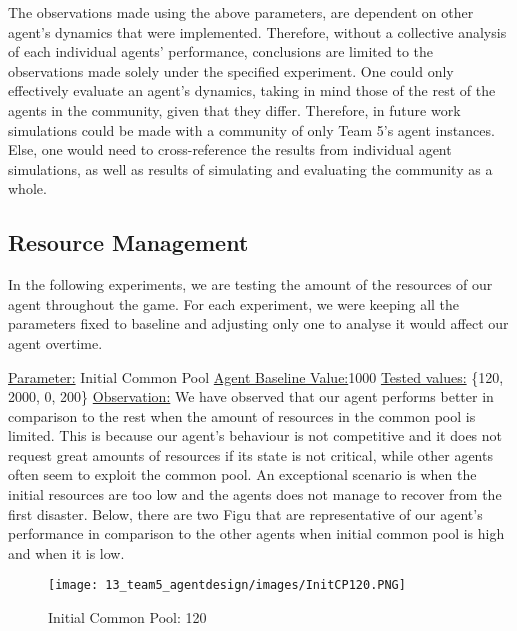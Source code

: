 The observations made using the above parameters, are dependent on other agent’s dynamics that were implemented. Therefore, without a collective analysis of each individual agents’ performance, conclusions are limited to the observations made solely under the specified experiment. One could only effectively evaluate an agent’s dynamics, taking in mind those of the rest of the agents in the community, given that they differ. Therefore, in future work simulations could be made with a community of only Team 5’s agent instances. Else, one would need to cross-reference the results from individual agent simulations, as well as results of simulating and evaluating the community as a whole. 

\subsection{Resource Management}

In the following experiments, we are testing the amount of the resources of our agent throughout the game. For each experiment, we were keeping all the parameters fixed to baseline and adjusting only one to analyse it would affect our agent overtime. 

\underline{Parameter:} Initial Common Pool \newline
\underline{Agent Baseline Value:}1000 \newline
\underline{Tested values:} \{120, 2000, 0, 200\} \newline
\underline{Observation:} \newline
We have observed that our agent performs better in comparison to the rest when the amount of resources in the common pool is limited. This is because our agent's behaviour is not competitive and it does not request great amounts of resources if its state is not critical, while other agents often seem to exploit the common pool. An exceptional scenario is when the initial resources are too low and the agents does not manage to recover from the first disaster.
Below, there are two Figu that are representative of our agent's performance in comparison to the other agents when initial common pool is high and when it is low.

\begin{figure}[!htb]
    \centering
    \texttt{[image: 13\_team5\_agentdesign/images/InitCP120.PNG]}
    \caption{Initial Common Pool: 120}
    \label{eq:Initial Common Pool: 120}
\end{figure}

